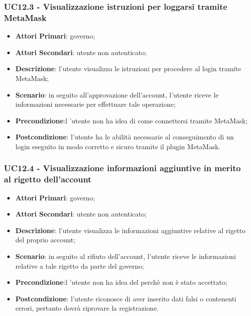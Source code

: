 \subsubsection{UC12.3 - Visualizzazione istruzioni per loggarsi tramite MetaMask\glo}
\begin{itemize}
	\item \textbf{Attori Primari}:
	governo;
	\item \textbf{Attori Secondari}:
	utente non autenticato;
	\item \textbf{Descrizione}: l'utente visualizza le istruzioni per procedere al login tramite MetaMask\glo;
	\item \textbf{Scenario}: in seguito all'approvazione dell'account, l'utente riceve le informazioni necessarie per effettuare tale operazione;
	\item \textbf{Precondizione}:l 'utente non ha idea di come connettersi tramite MetaMask\glo;
	\item \textbf{Postcondizione}: l'utente ha le abilità necessarie al conseguimento di un login eseguito in modo corretto e sicuro tramite il plugin MetaMask\glo.
\end{itemize}
\subsubsection{UC12.4 - Visualizzazione informazioni aggiuntive in merito al rigetto dell'account}
\begin{itemize}
	\item \textbf{Attori Primari}:
	governo;
	\item \textbf{Attori Secondari}:
	utente non autenticato;
	\item \textbf{Descrizione}: l'utente visualizza le informazioni aggiuntive relative al rigetto del proprio account;
	\item \textbf{Scenario}: in seguito al rifiuto dell'account, l'utente riceve le informazioni relative a tale rigetto da parte del governo;
	\item \textbf{Precondizione}:l 'utente non ha idea del perchè non è stato accettato;
	\item \textbf{Postcondizione}: l'utente riconosce di aver inserito dati falsi o contenenti errori, pertanto dovrà riprovare la registrazione.
\end{itemize}